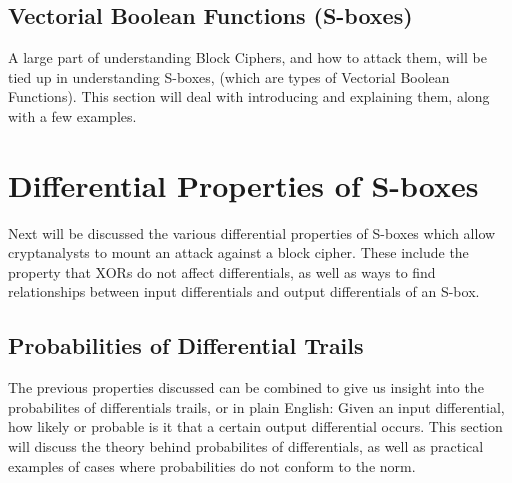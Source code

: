 \subsection{Vectorial Boolean Functions (S-boxes)}
A large part of understanding Block Ciphers, and how to attack them,
will be tied up in understanding S-boxes, (which are types of 
Vectorial Boolean Functions). This section will deal with introducing
and explaining them, along with a few examples.

\section{Differential Properties of S-boxes}
Next will be discussed the various differential properties of S-boxes
which allow cryptanalysts to mount an attack against a block cipher. 
These include the property that XORs do not affect differentials, as well
as ways to find relationships between input differentials and output
differentials of an S-box.

\subsection{Probabilities of Differential Trails}
The previous properties discussed can be combined to give us insight into
the probabilites of differentials trails, or in plain English: Given an
input differential, how likely or probable is it that a certain output
differential occurs. This section will discuss the theory behind probabilites
of differentials, as well as practical examples of cases where probabilities
do not conform to the norm.

